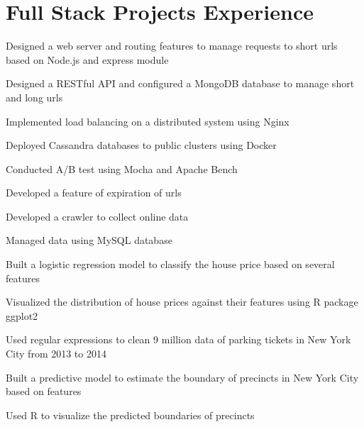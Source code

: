 \documentclass[]{20161017-v}
\begin{document}
\begin{minipage}[t]{0.66\textwidth} 


\section{Full Stack Projects Experience}

\descript{}
\vspace{\topsep} %
\begin{tightemize}
\item Designed a web server and routing features to manage requests to short urls based on Node.js and express module
\item Designed a RESTful API and configured a MongoDB database to manage short and long urls
\item Implemented load balancing on a distributed system using Nginx
\item Deployed Cassandra databases to public clusters using Docker
\item Conducted A/B test using Mocha and Apache Bench
\item Developed a feature of expiration of urls
\end{tightemize}
\sectionsep

\descript{}
\begin{tightemize}
\item Developed a crawler to collect online data
\item Managed data using MySQL database
\item Built a logistic regression model to classify the house price based on several features
\item Visualized the distribution of house prices against their features using R package ggplot2
\end{tightemize}
\sectionsep

\descript{}
\begin{tightemize}
\item Used regular expressions to clean 9 million data of parking tickets in New York City from 2013 to 2014
\item Built a predictive model to estimate the boundary of precincts in New York City based on features
\item Used R to visualize the predicted boundaries of precincts
\end{tightemize}
\sectionsep


\end{minipage}
\end{document}
